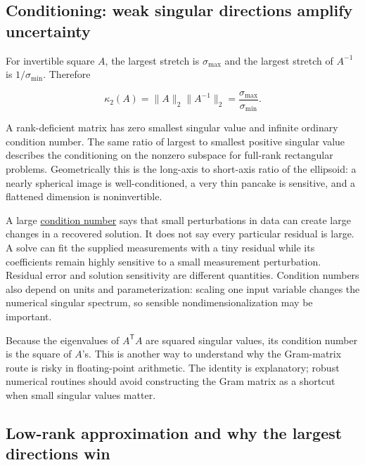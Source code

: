 \subsection{Conditioning: weak singular directions amplify uncertainty}\label{02-foundations-ii-ch024-conditioning-weak-singular-directions-amplify-uncertainty}

\hypertarget{02-foundations-ii-ch024-conditioning-weak-singular-directions-amplify-uncertainty}{}

For invertible square \(A\), the largest stretch is \(\sigma_{\max}\) and the largest stretch of \(A^{-1}\) is \(1/\sigma_{\min}\). Therefore

\[
\kappa_2(A)=\|A\|_2\|A^{-1}\|_2=\frac{\sigma_{\max}}{\sigma_{\min}}.
\]

A rank-deficient matrix has zero smallest singular value and infinite ordinary condition number. The same ratio of largest to smallest positive singular value describes the conditioning on the nonzero subspace for full-rank rectangular problems. Geometrically this is the long-axis to short-axis ratio of the ellipsoid: a nearly spherical image is well-conditioned, a very thin pancake is sensitive, and a flattened dimension is noninvertible.

A large \hyperref[01-foundations-i-ch018-an-inverse-can-exist-and-still-amplify-uncertainty]{condition number} says that small perturbations in data can create large changes in a recovered solution. It does not say every particular residual is large. A solve can fit the supplied measurements with a tiny residual while its coefficients remain highly sensitive to a small measurement perturbation. Residual error and solution sensitivity are different quantities. Condition numbers also depend on units and parameterization: scaling one input variable changes the numerical singular spectrum, so sensible nondimensionalization may be important.

Because the eigenvalues of \(A^\mathsf T A\) are squared singular values, its condition number is the square of \(A\)'s. This is another way to understand why the Gram-matrix route is risky in floating-point arithmetic. The identity is explanatory; robust numerical routines should avoid constructing the Gram matrix as a shortcut when small singular values matter.

\subsection{Low-rank approximation and why the largest directions win}\label{02-foundations-ii-ch024-low-rank-approximation-and-why-the-largest-directions-win}

